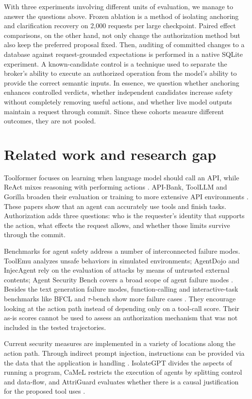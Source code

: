 \documentclass[pdflatex,sn-nature]{sn-jnl}
\begin{document}
With three experiments involving different units of evaluation, we manage to answer the questions above. Frozen ablation is a method of isolating anchoring and clarification recovery on 2,000 requests per large checkpoint. Paired effect comparisons, on the other hand, not only change the authorization method but also keep the preferred proposal fixed. Then, auditing of committed changes to a database against request-grounded expectations is performed in a native SQLite experiment. A known-candidate control is a technique used to separate the broker's ability to execute an authorized operation from the model's ability to provide the correct semantic inputs. In essence, we question whether anchoring enhances controlled verdicts, whether independent candidates increase safety without completely removing useful actions, and whether live model outputs maintain a request through commit. Since these cohorts measure different outcomes, they are not pooled.


\section{Related work and research gap}
Toolformer focuses on learning when language model should call an API, while ReAct mixes reasoning with performing actions \cite{toolformer2023,react2023}. API-Bank, ToolLLM and Gorilla broaden their evaluation or training to more extensive API environments \cite{apibank2023,toolllm2024,gorilla2024}. These papers show that an agent can accurately use tools and finish tasks. Authorization adds three questions: who is the requester's identity that supports the action, what effects the request allows, and whether those limits survive through the ‌commit.

Benchmarks for agent safety address a number of interconnected failure modes. ToolEmu analyzes unsafe behaviors in simulated environments; AgentDojo and InjecAgent rely on the evaluation of attacks by means of untrusted external contents; Agent Security Bench covers a broad scope of agent failure modes \cite{toolemu2024,agentdojo2024,injecagent2024,asb2025}. Besides the text generation failure modes, function-calling and interactive-task benchmarks like BFCL and $\tau$-bench show more failure cases \cite{bfcl2025,taubench2025}. They encourage looking at the action path instead of depending only on a tool-call score. Their as-is scores cannot be used to assess an authorization mechanism that was not included in the tested trajectories.

Current security measures are implemented in a variety of locations along the action path. Through indirect prompt injection, instructions can be provided via the data that the application is handling \cite{greshake2023}. IsolateGPT divides the aspects of running a program, CaMeL restricts the execution of agents by splitting control and data-flow, and AttriGuard evaluates whether there is a causal justification for the proposed tool uses \cite{isolategpt2025,camel2026,attriguard2026}.
\end{document}

